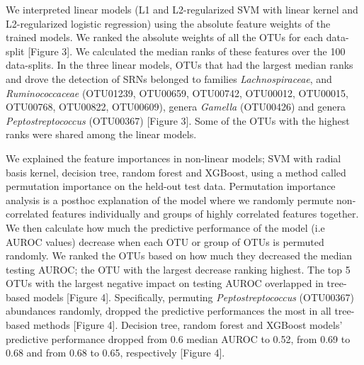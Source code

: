 \documentclass[11pt,]{article}
\begin{document}
We interpreted linear models (L1 and L2-regularized SVM with linear
kernel and L2-regularized logistic regression) using the absolute
feature weights of the trained models. We ranked the absolute weights of
all the OTUs for each data-split {[}Figure 3{]}. We calculated the
median ranks of these features over the 100 data-splits. In the three
linear models, OTUs that had the largest median ranks and drove the
detection of SRNs belonged to families \emph{Lachnospiraceae}, and
\emph{Ruminococcaceae} (OTU01239, OTU00659, OTU00742, OTU00012,
OTU00015, OTU00768, OTU00822, OTU00609), genera \emph{Gamella}
(OTU00426) and genera \emph{Peptostreptococcus} (OTU00367) {[}Figure
3{]}. Some of the OTUs with the highest ranks were shared among the
linear models.

We explained the feature importances in non-linear models; SVM with
radial basis kernel, decision tree, random forest and XGBoost, using a
method called permutation importance on the held-out test data.
Permutation importance analysis is a posthoc explanation of the model
where we randomly permute non-correlated features individually and
groups of highly correlated features together. We then calculate how
much the predictive performance of the model (i.e AUROC values) decrease
when each OTU or group of OTUs is permuted randomly. We ranked the OTUs
based on how much they decreased the median testing AUROC; the OTU with
the largest decrease ranking highest. The top 5 OTUs with the largest
negative impact on testing AUROC overlapped in tree-based models
{[}Figure 4{]}. Specifically, permuting \emph{Peptostreptococcus}
(OTU00367) abundances randomly, dropped the predictive performances the
most in all tree-based methods {[}Figure 4{]}. Decision tree, random
forest and XGBoost models' predictive performance dropped from 0.6
median AUROC to 0.52, from 0.69 to 0.68 and from 0.68 to 0.65,
respectively {[}Figure 4{]}.
\end{document}
